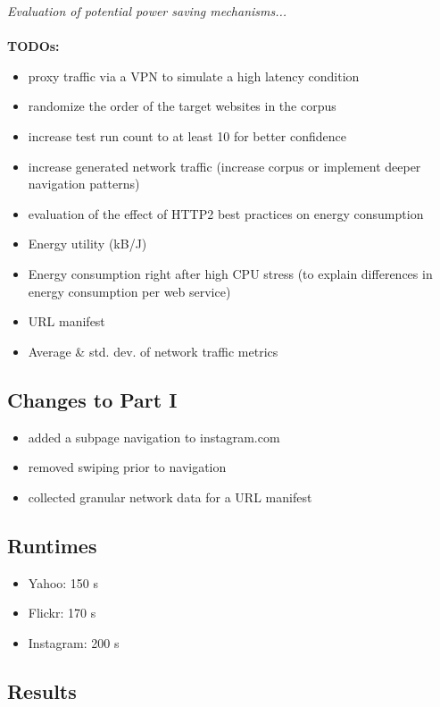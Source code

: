 \documentclass{article}
\begin{document}
\emph{Evaluation of potential power saving mechanisms...}
\\ \\
\textbf{TODOs:}
\begin{itemize}
    \item proxy traffic via a VPN to simulate a high latency condition
    \item randomize the order of the target websites in the corpus
    \item increase test run count to at least 10 for better confidence
    \item increase generated network traffic (increase corpus or implement deeper navigation patterns)
    \item evaluation of the effect of HTTP2 best practices on energy consumption
    \item Energy utility (kB/J)
    \item Energy consumption right after high CPU stress (to explain differences in energy consumption per web service)
    \item URL manifest
    \item Average \& std. dev. of network traffic metrics
\end{itemize}

\subsection{Changes to Part I}
\begin{itemize}
    \item added a subpage navigation to instagram.com
    \item removed swiping prior to navigation
    \item collected granular network data for a URL manifest
\end{itemize}

\subsection{Runtimes}
\begin{itemize}
    \item Yahoo: 150 s
    \item Flickr: 170 s
    \item Instagram: 200 s
\end{itemize}


\subsection{Results}
\end{document}
